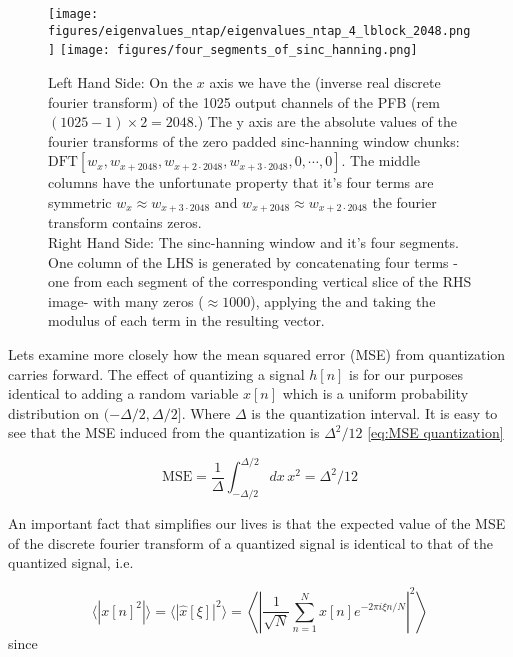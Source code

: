 \documentclass[12pt]{article}
\begin{document}
\begin{figure}[H]
    \centering
    \texttt{[image: figures/eigenvalues\_ntap/eigenvalues\_ntap\_4\_lblock\_2048.png]}
    \texttt{[image: figures/four\_segments\_of\_sinc\_hanning.png]}
    \caption{Left Hand Side: On the $x$ axis we have the  (inverse real discrete fourier transform) of the 1025 output channels of the PFB (rem $(1025-1)\times 2 = 2048$.) The y axis are the absolute values of the fourier transforms of the zero padded sinc-hanning window chunks: $\text{DFT} [w_x,w_{x+2048},w_{x+2\cdot 2048},w_{x+3\cdot 2048},0,\cdots,0]$. The middle columns have the unfortunate property that it's four terms are symmetric $w_x \approx w_{x+3\cdot 2048}$ and $w_{x+2048}\approx w_{x+2\cdot 2048}$ the fourier transform contains zeros.\\
    Right Hand Side: The sinc-hanning window and it's four segments. One column of the LHS is generated by concatenating four terms -one from each segment of the corresponding vertical slice of the RHS image- with many zeros ($\approx 1000$), applying the  and taking the modulus of each term in the resulting vector.}
    \label{fig:eigenvalues sinc hanning ntap=4}
\end{figure}

Lets examine more closely how the mean squared error (MSE) from quantization carries forward. The effect of quantizing a signal $h[n]$ is for our purposes identical to adding a random variable $x[n]$ which is a uniform probability distribution on $(-\Delta/2,\Delta/2]$. Where $\Delta$ is the quantization interval. It is easy to see that the MSE induced from the quantization is $\Delta^2/12$ \eqref{eq:MSE quantization}

\begin{equation}\label{eq:MSE quantization}
    \text{MSE} = \frac{1}{\Delta}\int_{-\Delta/2}^{\Delta/2} dx\, x^2 = \Delta^2/12
\end{equation}

An important fact that simplifies our lives is that the expected value of the MSE of the discrete fourier transform of a quantized signal is identical to that of the quantized signal, i.e.

\begin{equation}\label{eq:MSE invariant under DFT}
\langle |x[n]^2| \rangle = \langle |\widehat x[\xi]|^2\rangle = \left\langle \left| \frac{1}{\sqrt N}\sum_{n=1}^N x[n] e^{-2\pi i \xi n/N}\right|^2 \right\rangle
\end{equation}
since
\end{document}
